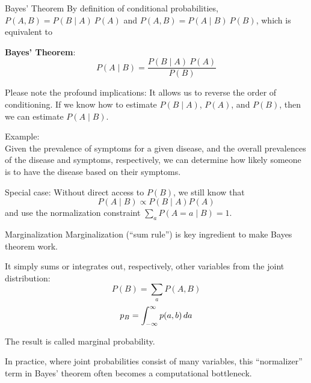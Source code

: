 {    \begin{frame}{Bayes' Theorem}
        By definition of conditional probabilities, $P(A, B) = P(B\mid A)\:P(A)$ and
        $P(A, B) = P(A\mid B)\:P(B)$,
        which is equivalent to
        \begin{boxed}
            \textbf{Bayes' Theorem}:
            $$P(A \mid B) = \frac{P(B\mid A)\:P(A)}{P(B)}$$
        \end{boxed}

        Please note the profound implications: It allows us to reverse the order of conditioning. If
        we know how to estimate $P(B\mid A)$, $P(A)$, and $P(B)$, then we can estimate $P(A\mid B)$.

        Example:\\
        Given  the prevalence of symptoms for a given disease,
        and the overall prevalences of the disease and symptoms, respectively,
        we can determine how likely someone is to have the disease based on their symptoms.

        Special case: Without direct access to $P(B)$, we still know that
        $$P(A \mid B) \propto P(B \mid A) P(A)$$
        and use the normalization constraint $\sum_a P(A=a \mid B) = 1$.

    \end{frame}

    \begin{frame}{Marginalization}
        Marginalization (``sum rule'') is key ingredient to make Bayes theorem work.

        It simply sums or integrates out, respectively, other variables from the joint distribution:
        $$P(B) = \sum_a P(A, B)$$
        $$p_B = \int_{-\infty}^{\infty} p(a,b)\mathop{da}$$

        The result is called marginal probability.

        In practice, where joint probabilities consist of many variables, this ``normalizer'' term
        in Bayes' theorem often becomes a computational bottleneck.
    \end{frame}

}

